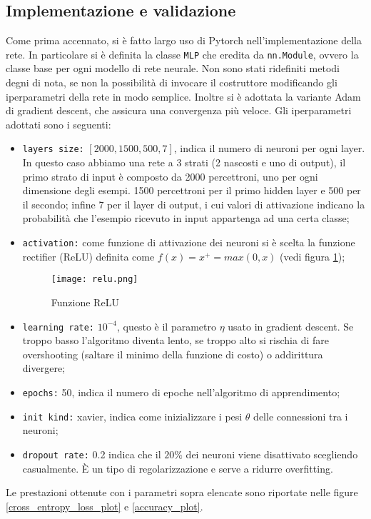 \subsection{Implementazione e validazione}
Come prima accennato, si è fatto largo uso di Pytorch nell'implementazione della rete. In particolare si è definita la classe \verb|MLP| che eredita da \verb|nn.Module|, ovvero la classe base per ogni modello di rete neurale. Non sono stati ridefiniti metodi degni di nota, se non la possibilità di invocare il costruttore modificando gli iperparametri della rete in modo semplice. Inoltre si è adottata la variante Adam di gradient descent, che assicura una convergenza più veloce. Gli iperparametri adottati sono i seguenti:
\begin{itemize}
    \item \verb|layers size:| $[2000, 1500, 500, 7]$, indica il numero di neuroni per ogni layer. In questo caso abbiamo una rete a 3 strati (2 nascosti e uno di output), il primo strato di input è composto da 2000 percettroni, uno per ogni dimensione degli esempi. 1500 percettroni per il primo hidden layer e 500 per il secondo; infine 7 per il layer di output, i cui valori di attivazione indicano la probabilità che l'esempio ricevuto in input appartenga ad una certa classe;
    \item \verb|activation:| come funzione di attivazione dei neuroni si è scelta la funzione rectifier (ReLU) definita come $f(x) = x^+ = max(0,x)$ (vedi figura \ref*{relu_func});
    \begin{figure}
        \centering
        \texttt{[image: relu.png]}
        \caption{Funzione ReLU}
        \label{relu_func}
    \end{figure}
    \item \verb|learning rate:| $10^{-4}$, questo è il parametro $\eta$ usato in gradient descent. Se troppo basso l'algoritmo diventa lento, se troppo alto si rischia di fare overshooting (saltare il minimo della funzione di costo) o addirittura divergere;
    \item \verb|epochs:| 50, indica il numero di epoche nell'algoritmo di apprendimento;
    \item \verb|init kind:| xavier, indica come inizializzare i pesi $\theta$ delle connessioni tra i neuroni;
    \item \verb|dropout rate:| 0.2 indica che il $20\%$ dei neuroni viene disattivato scegliendo casualmente. È un tipo di regolarizzazione e serve a ridurre overfitting.
\end{itemize}
Le prestazioni ottenute con i parametri sopra elencate sono riportate nelle figure \ref*{cross_entropy_loss_plot} e \ref*{accuracy_plot}. 

